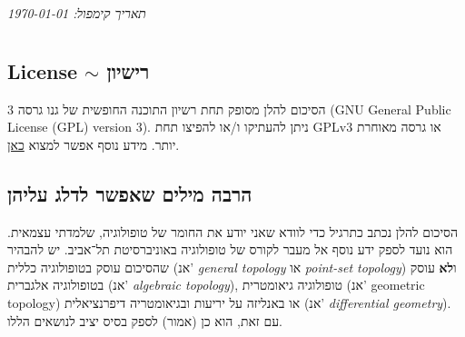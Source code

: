 \documentclass[name=רשימות טופולוגיה כללית]{../../../tex/classes/noChapterMegasumPreamble}
\author{שחר פרץ}
\title{\name}
\date{2025 סמסטר ב'}
\begin{document}
	\renewcommand{\footrule}{\rule{\linewidth-19pt}{0.25pt}\vspace{-5pt}}
	
	\newpage
	
	
	\hfil \textit{תאריך קימפול: \today}
	
	\setcounter{section}{-1}	
\section[מבוא למבוא]{}
\subsection[רישיון]{License $\sim$ רישיון}
			
			הסיכום להלן מסופק תחת רשיון התוכנה החופשית של גנו גרסה 3 (GNU General Public License (GPL) version 3). ניתן להעתיקו ו/או להפיצו תחת GPLv3 או גרסה מאוחרת יותר. מידע נוסף אפשר למצוא \href{https://www.gnu.org/licenses}{כאן}. 
		
	\subsection{הרבה מילים שאפשר לדלג עליהן}
	הסיכום להלן נכתב כתרגיל כדי לוודא שאני יודע את החומר של טופולוגיה, שלמדתי עצמאית. הוא נועד לספק ידע נוסף אל מעבר לקורס של טופולוגיה באוניברסיטת תל־אביב. יש להבהיר שהסיכום עוסק בטופולוגיה כללית (אנ' \textit{general topology} או \textit{point-set topology}) ו\textbf{לא} עוסק בטופולוגיה אלגברית (אנ' \textit{algebraic topology}), טופולוגיה גיאומטרית (אנ' geometric topology) או באנליזה על יריעות ובגיאומטריה דיפרנציאלית (אנ' \textit{differential geometry}). עם זאת, הוא כן (אמור) לספק בסיס יציב לנושאים הללו. 
	
\end{document}
